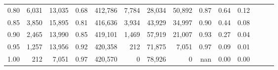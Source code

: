 \begin{tabular}{rrrrrrrrrrrrrr}
0.80 &   6,031 &  13,035 &  0.68 &  412,786 &    7,784 &  28,034 &  50,892 &  0.87 &  0.64 &      0.12 \\
0.85 &   3,850 &  15,895 &  0.81 &  416,636 &    3,934 &  43,929 &  34,997 &  0.90 &  0.44 &      0.08 \\
0.90 &   2,465 &  13,990 &  0.85 &  419,101 &    1,469 &  57,919 &  21,007 &  0.93 &  0.27 &      0.04 \\
0.95 &   1,257 &  13,956 &  0.92 &  420,358 &      212 &  71,875 &   7,051 &  0.97 &  0.09 &      0.01 \\
1.00 &     212 &   7,051 &  0.97 &  420,570 &        0 &  78,926 &       0 &   nan &  0.00 &      0.00 \\
\bottomrule
\end{tabular}
